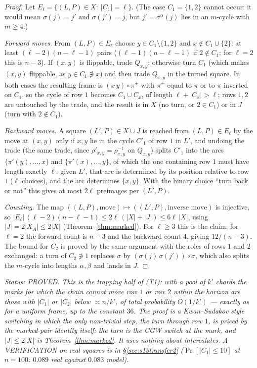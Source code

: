 \begin{proof}
Let $E_\ell=\{(L,P)\in X:\ |C_1|=\ell\}$.  (The case $C_1=\{1,2\}$
cannot occur: it would mean $\sigma(j)=j'$ and $\sigma(j')=j$, but
$j'=\sigma^\alpha(j)$ lies in an $m$-cycle with $m\ge4$.)

\emph{Forward moves.}  From $(L,P)\in E_\ell$ choose $y\in C_1\setminus\{1,2\}$
and $x\notin C_1\cup\{2\}$: at least $(\ell-2)(n-\ell-1)$ pairs
($(\ell-1)(n-\ell-1)$ if $2\notin C_1$; for $\ell=2$ this is $n-3$).
If $(x,y)$ is flippable, trade $Q_{x,y}$; otherwise turn $C_1$ (which
makes $(x,y)$ flippable, as $y\in C_1\not\ni x$) and then trade
$Q_{x,y}$ in the turned square.  In both cases the resulting frame is
$(x\,y)\circ\pi^\pm$ with $\pi^\pm$ equal to $\pi$ or to $\pi$
inverted on $C_1$, so the cycle of row $1$ becomes $C_1\cup C_x$, of
length $\ell+|C_x|>\ell$; rows $1,2$ are untouched by the trade, and
the result is in $X$ (no turn, or $2\in C_1$) or in $J$ (turn with
$2\notin C_1$).

\emph{Backward moves.}  A square $(L',P)\in X\cup J$ is reached from
$(L,P)\in E_\ell$ by the move at $(x,y)$ only if $x,y$ lie in the cycle
$C'_1$ of row $1$ in $L'$, and undoing the trade (the same trade, since
$\rho'_{x,y}=\rho_{x,y}^{-1}$ on $Q_{x,y}$) splits $C'_1$ into the arcs
$\{\pi'(y),\dots,x\}$ and $\{\pi'(x),\dots,y\}$, of which the one
containing row $1$ must have length exactly $\ell$: given $L'$, that
arc is determined by its position relative to row $1$ ($\ell$
choices), and the arc determines $\{x,y\}$.  With the binary choice
``turn back or not'' this gives at most $2\ell$ preimages per $(L',P)$.

\emph{Counting.}  The map $((L,P),\text{move})\mapsto((L',P),\text{inverse move})$
is injective, so
$|E_\ell|\,(\ell-2)(n-\ell-1)\le2\ell\,(|X|+|J|)\le6\ell\,|X|$, using
$|J|=2|X_A|\le2|X|$ (Theorem~\ref{thm:marked}).  For $\ell\ge3$ this
is the claim; for $\ell=2$ the forward count is $n-3$ and the backward
count $4$, giving $12/(n-3)$.  The bound for $C_2$ is proved by the
same argument with the roles of rows $1$ and $2$ exchanged: a turn of
$C_2\not\ni1$ replaces $\sigma$ by $(\sigma(j)\,\sigma(j'))\circ\sigma$,
which also splits the $m$-cycle into lengths $\alpha,\beta$ and lands
in $J$.
\end{proof}

\emph{Status: PROVED.  This is
the trapping half of (T1): with a pool of $k'$ chords the marks for
which the chain cannot move row $1$ or row $2$ within the horizon are
those with $|C_1|$ or $|C_2|$ below $\asymp n/k'$, of total probability
$O(1/k')$ --- exactly as for a uniform frame, up to the constant $36$.
The proof is a Kwan--Sudakov style switching \cite{KS18} in which the
only non-trivial step, the turn through row $1$, is priced by the
marked-pair identity itself: the turn is the CGW switch at the mark,
and $|J|\le2|X|$ is Theorem~\ref{thm:marked}.  It uses nothing about
intercalates.  A VERIFICATION on real squares is in
\S\ref{sec:s13transfer2} ($\Pr[|C_1|\le10]$ at $n=100$: $0.089$
real against $0.083$ model).}

